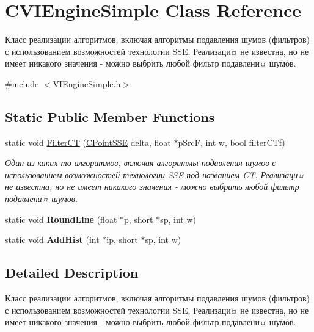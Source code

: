 \hypertarget{class_c_v_i_engine_simple}{\section{C\+V\+I\+Engine\+Simple Class Reference}
\label{class_c_v_i_engine_simple}
}


Класс реализации алгоритмов, включая алгоритмы подавления шумов (фильтров) с использованием возможностей технологии S\+S\+E. Реализаци¤ не известна, но не имеет никакого значения -\/ можно выбрить любой фильтр подавлени¤ шумов.  




{\ttfamily \#include $<$V\+I\+Engine\+Simple.\+h$>$}

\subsection*{Static Public Member Functions}
\begin{DoxyCompactItemize}
\item 
static void \hyperlink{class_c_v_i_engine_simple_a2b0441394c18c07d7d90fb13998c0355}{Filter\+C\+T} (\hyperlink{class_c_point_s_s_e}{C\+Point\+S\+S\+E} delta, float $\ast$p\+Src\+F, int w, bool filter\+C\+Tf)
\begin{DoxyCompactList}\small\item\em Один из каких-\/то алгоритмов, включая алгоритмы подавления шумов с использованием возможностей технологии S\+S\+E под названием C\+T. Реализаци¤ не известна, но не имеет никакого значения -\/ можно выбрить любой фильтр подавлени¤ шумов. \end{DoxyCompactList}\item 
\hypertarget{class_c_v_i_engine_simple_a607ec0a835e39493e7d5271ad1ff1b4c}{static void {\bfseries Round\+Line} (float $\ast$p, short $\ast$sp, int w)}\label{class_c_v_i_engine_simple_a607ec0a835e39493e7d5271ad1ff1b4c}

\item 
\hypertarget{class_c_v_i_engine_simple_a41c72e5c5e19dfbd2a7e97c7ec4952c2}{static void {\bfseries Add\+Hist} (int $\ast$ip, short $\ast$sp, int w)}\label{class_c_v_i_engine_simple_a41c72e5c5e19dfbd2a7e97c7ec4952c2}

\end{DoxyCompactItemize}


\subsection{Detailed Description}
Класс реализации алгоритмов, включая алгоритмы подавления шумов (фильтров) с использованием возможностей технологии S\+S\+E. Реализаци¤ не известна, но не имеет никакого значения -\/ можно выбрить любой фильтр подавлени¤ шумов. 



